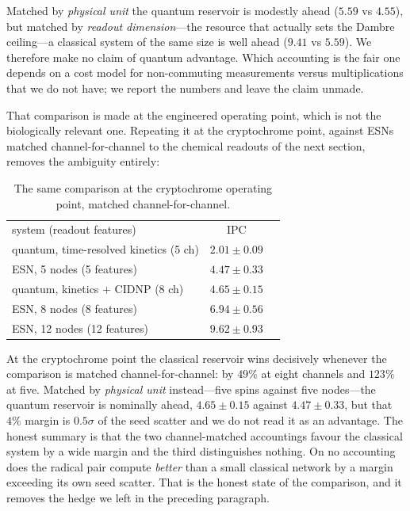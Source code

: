 \documentclass[aps,prx,reprint,superscriptaddress,nofootinbib,floatfix]{revtex4-2}
\begin{document}
Matched by \emph{physical unit} the quantum reservoir is modestly ahead
($5.59$ vs $4.55$), but matched by \emph{readout dimension}---the resource that
actually sets the Dambre ceiling---a classical system of the same size is well ahead
($9.41$ vs $5.59$). We therefore make no claim of quantum advantage. Which
accounting is the fair one depends on a cost model for non-commuting measurements
versus multiplications that we do not have; we report the numbers and leave the
claim unmade.

That comparison is made at the engineered operating point, which is not the
biologically relevant one. Repeating it at the cryptochrome point, against ESNs
matched channel-for-channel to the chemical readouts of the next section, removes
the ambiguity entirely:

\begin{table}[htbp]
\caption{\label{tab:esn_cry}The same comparison at the cryptochrome operating point, matched channel-for-channel.}
\begin{ruledtabular}
\begin{tabular}{lcc}
system (readout features) & IPC \\
quantum, time-resolved kinetics (5 ch) & $2.01\pm0.09$ \\
ESN, 5 nodes (5 features) & $4.47\pm0.33$ \\
quantum, kinetics $+$ CIDNP (8 ch) & $4.65\pm0.15$ \\
ESN, 8 nodes (8 features) & $6.94\pm0.56$ \\
ESN, 12 nodes (12 features) & $9.62\pm0.93$ \\
\end{tabular}
\end{ruledtabular}
\end{table}

At the cryptochrome point the classical reservoir wins decisively whenever the
comparison is matched channel-for-channel: by $49\%$ at eight channels and $123\%$
at five. Matched by \emph{physical unit} instead---five spins against five
nodes---the quantum reservoir is nominally ahead, $4.65\pm0.15$ against
$4.47\pm0.33$, but that $4\%$ margin is $0.5\sigma$ of the seed scatter and we do
not read it as an advantage. The honest summary is that the two channel-matched
accountings favour the classical system by a wide margin and the third
distinguishes nothing. On no accounting does the radical pair compute
\emph{better} than a small classical network by a margin exceeding its own seed
scatter. That is the honest state of the comparison, and it removes the hedge we
left in the preceding paragraph.
\end{document}
